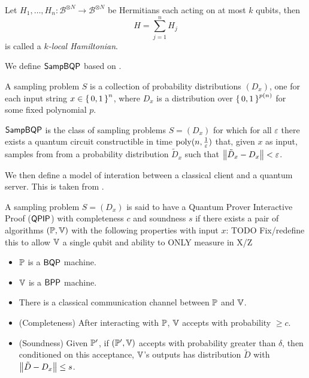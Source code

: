\begin{definition}
	Let $H_1, \ldots, H_n:\mathcal{B}^{\otimes N}\rightarrow\mathcal{B}^{\otimes N}$ be Hermitians each acting on at most $k$ qubits, then $$H=\sum_{j=1}^nH_j$$ is called a \emph{$k$-local Hamiltonian}.
\end{definition}

We define $\operatorname{\mathsf{SampBQP}}$ based on \cite{aaronson_2013}.

\begin{definition}
	A sampling problem $S$ is a collection of probability distributions $(D_x)$, one for each input string $x\in\set{0,1}^n$, where $D_x$ is a distribution over $\set{0,1}^{p(n)}$ for some fixed polynomial $p$.
\end{definition}

\begin{definition}
	$\operatorname{\mathsf{SampBQP}}$ is the class of sampling problems $S=(D_x)$ for which for all $\varepsilon$ there exists a quantum circuit constructible in time $\operatorname*{\operatorname{poly}}(n, \frac{1}{\varepsilon})$ that, given $x$ as input, samples from from a probability distribution $\tilde{D}_x$ such that $\left\lVert\tilde{D}_x-D_x\right\rVert<\varepsilon$.
\end{definition}

We then define a model of interation between a classical client and a quantum server. This is taken from \cite{mahadev_delegation}.

\begin{definition}
	A sampling problem $S=(D_x)$ is said to have a Quantum Prover Interactive Proof ($\operatorname{\mathsf{QPIP}}$) with completeness $c$ and soundness $s$ if there exists a pair of algorithms $(\mathbb{P}, \mathbb{V})$ with the following properties with input $x$:
	TODO Fix/redefine this to allow $\mathbb{V}$ a single qubit and ability to ONLY measure in X/Z
	\begin{itemize}
		\item $\mathbb{P}$ is a $\operatorname{\mathsf{BQP}}$ machine.
		\item $\mathbb{V}$ is a $\operatorname{\mathsf{BPP}}$ machine.
		\item There is a classical communication channel between $\mathbb{P}$ and $\mathbb{V}$.
		\item (Completeness) After interacting with $\mathbb{P}$, $\mathbb{V}$ accepts with probability $\geq c$.
		\item (Soundness) Given $\mathbb{P}'$, if $(\mathbb{P}', \mathbb{V})$ accepts with probability greater than $\delta$, then conditioned on this acceptance, $\mathbb{V}$'s outputs has distribution $\tilde{D}$ with $\left\lVert\tilde{D}-D_x\right\rVert\leq s$.
	\end{itemize}
\end{definition}

